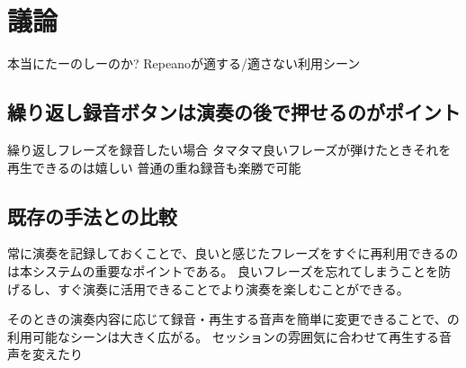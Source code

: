 \section{議論}

本当にたーのしーのか?
Repeanoが適する/適さない利用シーン

\subsection{繰り返し録音ボタンは演奏の後で押せるのがポイント}

繰り返しフレーズを録音したい場合
タマタマ良いフレーズが弾けたときそれを再生できるのは嬉しい
普通の重ね録音も楽勝で可能

\subsection{既存の手法との比較}






常に演奏を記録しておくことで、良いと感じたフレーズをすぐに再利用できるのは本システムの重要なポイントである。
良いフレーズを忘れてしまうことを防げるし、すぐ演奏に活用できることでより演奏を楽しむことができる。

そのときの演奏内容に応じて録音・再生する音声を簡単に変更できることで、{\system}の利用可能なシーンは大きく広がる。
セッションの雰囲気に合わせて再生する音声を変えたり

